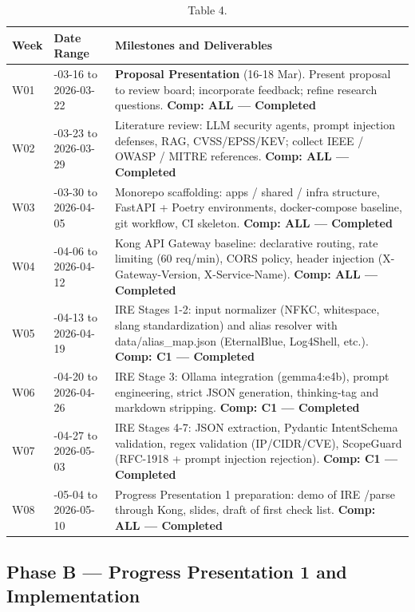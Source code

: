 \documentclass[10pt,journal,onecolumn]{IEEEtran}
\begin{document}
\begin{table}[h]
\caption{Table 4.}
\label{tab:t4}
\begin{tabularx}{\columnwidth}{l >{\raggedright\arraybackslash}X >{\raggedright\arraybackslash}X}
\toprule
\textbf{Week} & \textbf{Date Range} & \textbf{Milestones and Deliverables}\\
\midrule
W01 & 2026-03-16 to 2026-03-22 & \textbf{Proposal Presentation} (16-18 Mar). Present proposal to review board; incorporate feedback; refine research questions. \textbf{Comp: ALL --- Completed}\\
W02 & 2026-03-23 to 2026-03-29 & Literature review: LLM security agents, prompt injection defenses, RAG, CVSS/EPSS/KEV; collect IEEE / OWASP / MITRE references. \textbf{Comp: ALL --- Completed}\\
W03 & 2026-03-30 to 2026-04-05 & Monorepo scaffolding: apps / shared / infra structure, FastAPI + Poetry environments, docker-compose baseline, git workflow, CI skeleton. \textbf{Comp: ALL --- Completed}\\
W04 & 2026-04-06 to 2026-04-12 & Kong API Gateway baseline: declarative routing, rate limiting (60 req/min), CORS policy, header injection (X-Gateway-Version, X-Service-Name). \textbf{Comp: ALL --- Completed}\\
W05 & 2026-04-13 to 2026-04-19 & IRE Stages 1-2: input normalizer (NFKC, whitespace, slang standardization) and alias resolver with data/alias\_map.json (EternalBlue, Log4Shell, etc.). \textbf{Comp: C1 --- Completed}\\
W06 & 2026-04-20 to 2026-04-26 & IRE Stage 3: Ollama integration (gemma4:e4b), prompt engineering, strict JSON generation, thinking-tag and markdown stripping. \textbf{Comp: C1 --- Completed}\\
W07 & 2026-04-27 to 2026-05-03 & IRE Stages 4-7: JSON extraction, Pydantic IntentSchema validation, regex validation (IP/CIDR/CVE), ScopeGuard (RFC-1918 + prompt injection rejection). \textbf{Comp: C1 --- Completed}\\
W08 & 2026-05-04 to 2026-05-10 & Progress Presentation 1 preparation: demo of IRE /parse through Kong, slides, draft of first check list. \textbf{Comp: ALL --- Completed}\\
\bottomrule
\end{tabularx}
\end{table}

\subsection{Phase B --- Progress Presentation 1 and Implementation}
\end{document}
